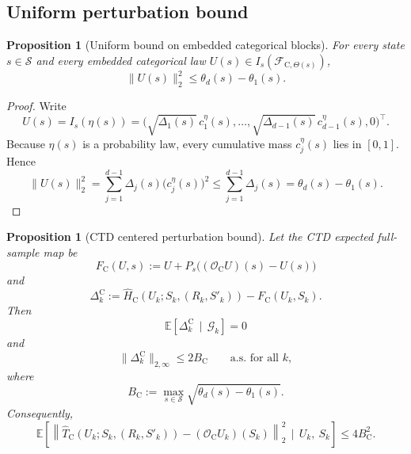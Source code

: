 \documentclass{article}
\newtheorem{proposition}[theorem]{Proposition}
\newcommand{\X}{\mathcal{S}}
\begin{document}
\subsection{Uniform perturbation bound}

\begin{proposition}[Uniform bound on embedded categorical blocks]
\label{prop:ctd-block-bound}
For every state $s\in \X$ and every embedded categorical law $U(s)\in I_s(\mathcal F_{\mathrm C,\Theta(s)})$,
\begin{equation}
\lVert U(s) \rVert_2^2 \le \theta_d(s)-\theta_1(s).
\end{equation}
\end{proposition}

\begin{proof}
Write
\begin{equation}
U(s)=I_s(\eta(s)) = \bigl( \sqrt{\Delta_1(s)}\,c^\eta_1(s), \dots, \sqrt{\Delta_{d-1}(s)}\,c^\eta_{d-1}(s),0\bigr)^\top.
\end{equation}
Because $\eta(s)$ is a probability law, every cumulative mass $c^\eta_j(s)$ lies in $[0,1]$. Hence
\begin{equation}
\lVert U(s) \rVert_2^2 = \sum_{j=1}^{d-1}\Delta_j(s)\bigl(c^\eta_j(s)\bigr)^2 \le \sum_{j=1}^{d-1}\Delta_j(s) = \theta_d(s)-\theta_1(s).
\end{equation}
\end{proof}

\begin{proposition}[CTD centered perturbation bound]
\label{prop:ctd-perturbation}
Let the CTD expected full-sample map be
\begin{equation}
F_{\mathrm C}(U,s) := U + P_s\bigl((\mathcal O_{\mathrm C}U)(s)-U(s)\bigr)
\end{equation}
and
\begin{equation}
\Delta_k^{\mathrm C} := \widehat H_{\mathrm C}(U_k;S_k,(R_k,S'_k)) - F_{\mathrm C}(U_k,S_k).
\end{equation}
Then
\begin{equation}
\mathbb E\left[ \Delta_k^{\mathrm C} \,\mid\, \mathcal G_k \right] = 0
\end{equation}
and
\begin{equation}
\lVert \Delta_k^{\mathrm C} \rVert_{2,\infty} \le 2B_{\mathrm C} \qquad\text{a.s. for all }k,
\end{equation}
where
\begin{equation}
B_{\mathrm C} := \max_{s\in \X}\sqrt{\theta_d(s)-\theta_1(s)}.
\end{equation}
Consequently,
\begin{equation}
\mathbb E\left[ \left\lVert \widehat T_{\mathrm C}(U_k;S_k,(R_k,S'_k))-(\mathcal O_{\mathrm C}U_k)(S_k) \right\rVert_2^2 \,\mid\, U_k,\ S_k \right] \le 4B_{\mathrm C}^2.
\end{equation}
\end{proposition}
\end{document}
